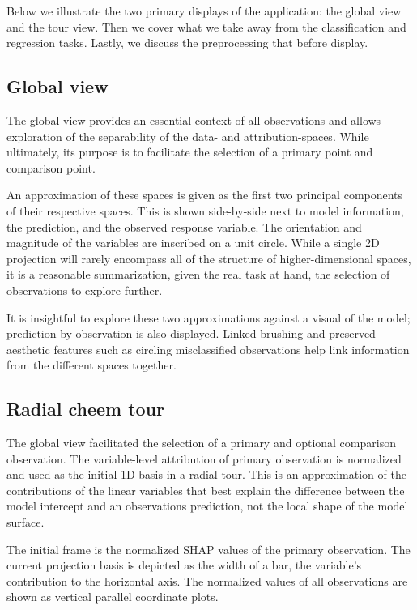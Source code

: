 \documentclass[
  article]{article}
\begin{document}
Below we illustrate the two primary displays of the application: the global view and the tour view. Then we cover what we take away from the classification and regression tasks. Lastly, we discuss the preprocessing that before display.

\hypertarget{global-view}{%
\subsection{Global view}\label{global-view}}

The global view provides an essential context of all observations and allows exploration of the separability of the data- and attribution-spaces. While ultimately, its purpose is to facilitate the selection of a primary point and comparison point.

An approximation of these spaces is given as the first two principal components of their respective spaces. This is shown side-by-side next to model information, the prediction, and the observed response variable. The orientation and magnitude of the variables are inscribed on a unit circle. While a single 2D projection will rarely encompass all of the structure of higher-dimensional spaces, it is a reasonable summarization, given the real task at hand, the selection of observations to explore further.

It is insightful to explore these two approximations against a visual of the model; prediction by observation is also displayed. Linked brushing and preserved aesthetic features such as circling misclassified observations help link information from the different spaces together.

\hypertarget{radial-cheem-tour}{%
\subsection{Radial cheem tour}\label{radial-cheem-tour}}

The global view facilitated the selection of a primary and optional comparison observation. The variable-level attribution of primary observation is normalized and used as the initial 1D basis in a radial tour. This is an approximation of the contributions of the linear variables that best explain the difference between the model intercept and an observations prediction, not the local shape of the model surface.

The initial frame is the normalized SHAP values of the primary observation. The current projection basis is depicted as the width of a bar, the variable's contribution to the horizontal axis. The normalized values of all observations are shown as vertical parallel coordinate plots.
\end{document}
